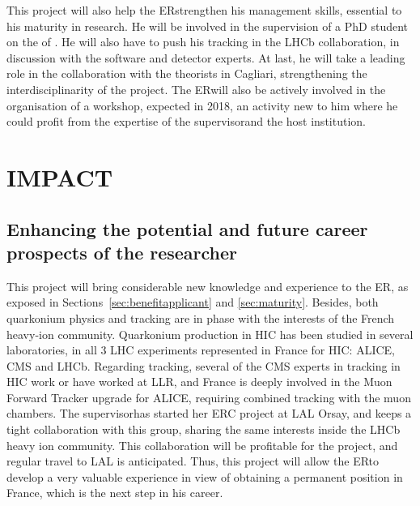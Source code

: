 \documentclass[a4paper,11pt]{article}
\newcommand{\ER}{ER}
\newcommand{\supervisor}{the supervisor}
\newcommand{\Supervisor}{The supervisor}
\begin{document}
This project will also help the \ER strengthen his management skills, essential to his maturity in research. He will be involved in the supervision of a PhD student on the \rpa of \PgUabc. He will also have to push his \pbpb tracking in the LHCb collaboration, in discussion with the software and detector experts. At last, he will 
take a leading role in the collaboration with the theorists in Cagliari, strengthening the interdisciplinarity of the project. The \ER will also be actively involved in the organisation of a workshop, expected in 2018, an activity new to him where he could profit from the expertise of \supervisor and the host institution.

%           

\section{IMPACT}
\label{sec:impact}

%               

\subsection{Enhancing the potential and future career prospects of the researcher }
\label{sec:enhancement}

This project will bring considerable new knowledge and experience to the \ER, as exposed in Sections~\ref{sec:benefitapplicant} and \ref{sec:maturity}. Besides, both quarkonium physics and tracking are in phase with the interests of the French heavy-ion community. Quarkonium production in HIC has been studied in several laboratories, in all 3 LHC experiments represented in France for HIC: ALICE, CMS and LHCb. Regarding tracking, several of the CMS experts in tracking in HIC work or have worked at LLR, and France is deeply involved in the Muon Forward Tracker upgrade for ALICE, requiring combined tracking with the muon chambers. \Supervisor has started her ERC project at LAL Orsay, and keeps a tight collaboration with this group, sharing the same interests inside the LHCb heavy ion community. This collaboration will be profitable for the project, and regular travel to LAL is anticipated. Thus, this project will allow the \ER to develop a very valuable experience in view of obtaining a permanent position in France, which is the next step in his career.
\end{document}
